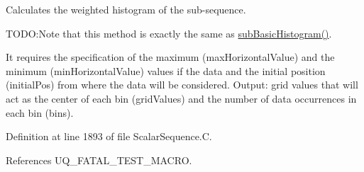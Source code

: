 Calculates the weighted histogram of the sub-\/sequence. 

T\-O\-D\-O\-:Note that this method is exactly the same as \hyperlink{class_q_u_e_s_o_1_1_scalar_sequence_aff0ffa9ef443c766c5ee0e36457c0c2d}{sub\-Basic\-Histogram()}.

It requires the specification of the maximum ({\ttfamily max\-Horizontal\-Value}) and the minimum ({\ttfamily min\-Horizontal\-Value}) values if the data and the initial position ({\ttfamily initial\-Pos}) from where the data will be considered. Output\-: grid values that will act as the center of each bin ({\ttfamily grid\-Values}) and the number of data occurrences in each bin ({\ttfamily bins}). 

Definition at line 1893 of file Scalar\-Sequence.\-C.



References U\-Q\-\_\-\-F\-A\-T\-A\-L\-\_\-\-T\-E\-S\-T\-\_\-\-M\-A\-C\-R\-O.


